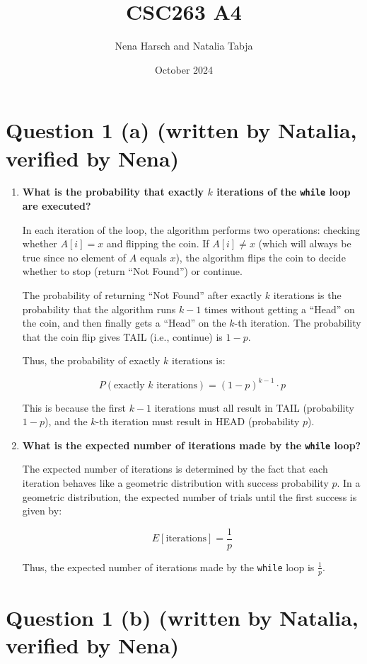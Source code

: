 \documentclass{article}
\title{CSC263 A4}
\author{Nena Harsch and Natalia Tabja}
\date{October 2024}
\begin{document}
\maketitle

\section*{Question 1 (a) (written by Natalia, verified by Nena)}

\begin{enumerate}
\item \textbf{What is the probability that exactly \(k\) iterations of the \texttt{while} loop are executed?}

In each iteration of the loop, the algorithm performs two operations: checking whether \(A[i] = x\) and flipping the coin. If \(A[i] \neq x\) (which will always be true since no element of \(A\) equals \(x\)), the algorithm flips the coin to decide whether to stop (return ``Not Found'') or continue.

The probability of returning ``Not Found'' after exactly \(k\) iterations is the probability that the algorithm runs \(k-1\) times without getting a ``Head'' on the coin, and then finally gets a ``Head'' on the \(k\)-th iteration. The probability that the coin flip gives TAIL (i.e., continue) is \(1 - p\).

Thus, the probability of exactly \(k\) iterations is:

\[
P(\text{exactly } k \text{ iterations}) = (1 - p)^{k-1} \cdot p
\]

This is because the first \(k-1\) iterations must all result in TAIL (probability \(1 - p\)), and the \(k\)-th iteration must result in HEAD (probability \(p\)).

\item{\textbf{What is the expected number of iterations made by the \texttt{while} loop?}}

The expected number of iterations is determined by the fact that each iteration behaves like a geometric distribution with success probability \(p\). In a geometric distribution, the expected number of trials until the first success is given by:

\[
E[\text{iterations}] = \frac{1}{p}
\]

Thus, the expected number of iterations made by the \texttt{while} loop is \( \frac{1}{p} \).
\end{enumerate}

\section*{Question 1 (b) (written by Natalia, verified by Nena)}
\end{document}
